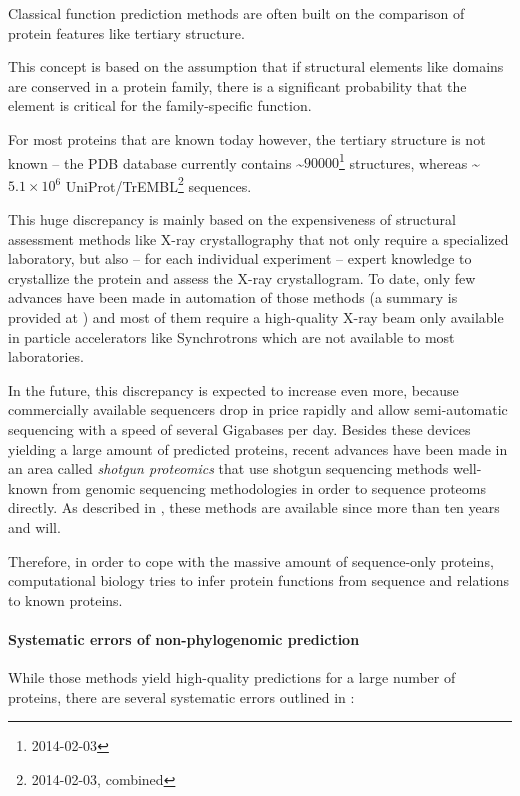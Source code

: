 \documentclass[pdftex,paper=A4,DIV=calc,titlepage,12pt]{scrartcl}
\newtheorem[L]{boxedDefinition}{Definition}
\begin{document}
Classical function prediction methods are often built on the comparison of protein features like tertiary structure.

This concept is based on the assumption that if structural elements like domains are conserved in a protein family, there is a significant probability that the element is critical for the family-specific function.

For most proteins that are known today however, the tertiary structure is not known -- the PDB database currently contains \textasciitilde$90000$\footnote{2014-02-03} structures, whereas  \textasciitilde$5.1\times10^6$ UniProt/TrEMBL\footnote{2014-02-03, combined} sequences.

This huge discrepancy is mainly based on the expensiveness of structural assessment methods like X-ray crystallography that not only require a specialized laboratory, but also -- for each individual experiment -- expert knowledge to crystallize the protein and assess the X-ray crystallogram. To date, only few advances have been made in automation of those methods (a summary is provided at \cite{groves2007recent}) and most of them require a high-quality X-ray beam only available in particle accelerators like Synchrotrons which are not available to most laboratories.

In the future, this discrepancy is expected to increase even more, because commercially available sequencers drop in price rapidly and allow semi-automatic sequencing with a speed of several Gigabases per day. Besides these devices yielding a large amount of predicted proteins, recent advances have been made in an area called \textit{shotgun proteomics} that use shotgun sequencing methods well-known from genomic sequencing methodologies in order to sequence proteoms directly. As described in \cite{wu2002shotgun}, these methods are available since more than ten years and will.

Therefore, in order to cope with the massive amount of sequence-only proteins, computational biology tries to infer protein functions from sequence and relations to known proteins.

\paragraph{Systematic errors of non-phylogenomic prediction}\label{p:syserrors}
While those methods yield high-quality predictions for a large number of proteins, there are several systematic errors outlined in \cite{brown2006functional}:
\end{document}
